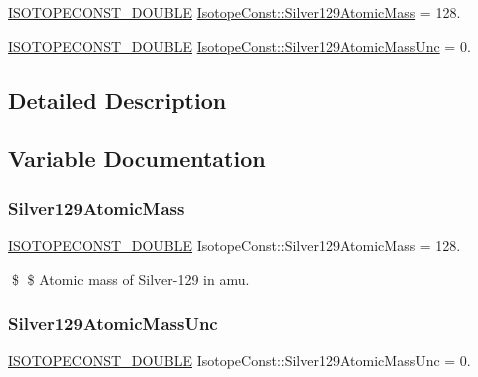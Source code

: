 \begin{DoxyCompactItemize}
\item 
\mbox{\hyperlink{group___isotope_const-_macros_ga8f45a7272ce02c0b4c65c44636ed719a}{I\+S\+O\+T\+O\+P\+E\+C\+O\+N\+S\+T\+\_\+\+D\+O\+U\+B\+LE}} \mbox{\hyperlink{group___isotope_const-_silver-_ag129_ga29c73988e4af23fb7e2390d87efb5146}{Isotope\+Const\+::\+Silver129\+Atomic\+Mass}} = 128.
\item 
\mbox{\hyperlink{group___isotope_const-_macros_ga8f45a7272ce02c0b4c65c44636ed719a}{I\+S\+O\+T\+O\+P\+E\+C\+O\+N\+S\+T\+\_\+\+D\+O\+U\+B\+LE}} \mbox{\hyperlink{group___isotope_const-_silver-_ag129_ga14353028779c5dd8966dd2528a81102b}{Isotope\+Const\+::\+Silver129\+Atomic\+Mass\+Unc}} = 0.
\end{DoxyCompactItemize}


\subsection{Detailed Description}


\subsection{Variable Documentation}
\mbox{\label{group___isotope_const-_silver-_ag129_ga29c73988e4af23fb7e2390d87efb5146}} 
\subsubsection{\texorpdfstring{Silver129\+Atomic\+Mass}{Silver129AtomicMass}}
{\footnotesize\ttfamily \mbox{\hyperlink{group___isotope_const-_macros_ga8f45a7272ce02c0b4c65c44636ed719a}{I\+S\+O\+T\+O\+P\+E\+C\+O\+N\+S\+T\+\_\+\+D\+O\+U\+B\+LE}} Isotope\+Const\+::\+Silver129\+Atomic\+Mass = 128.}

\$ \$ Atomic mass of Silver-\/129 in amu. \mbox{\label{group___isotope_const-_silver-_ag129_ga14353028779c5dd8966dd2528a81102b}} 
\subsubsection{\texorpdfstring{Silver129\+Atomic\+Mass\+Unc}{Silver129AtomicMassUnc}}
{\footnotesize\ttfamily \mbox{\hyperlink{group___isotope_const-_macros_ga8f45a7272ce02c0b4c65c44636ed719a}{I\+S\+O\+T\+O\+P\+E\+C\+O\+N\+S\+T\+\_\+\+D\+O\+U\+B\+LE}} Isotope\+Const\+::\+Silver129\+Atomic\+Mass\+Unc = 0.}

